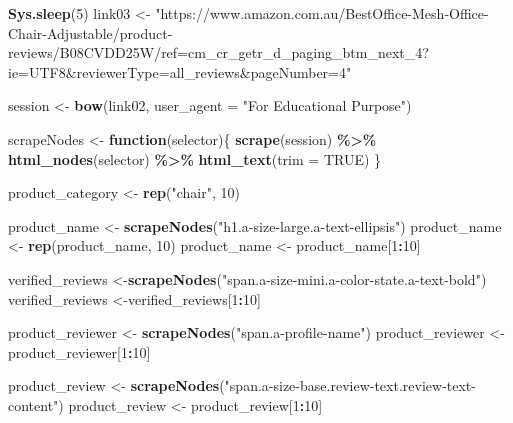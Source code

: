 \documentclass[
]{article}
\newenvironment{Shaded}{\begin{snugshade}}{\end{snugshade}}
\newcommand{\AttributeTok}[1]{\textcolor[rgb]{0.13,0.29,0.53}{#1}}
\newcommand{\ConstantTok}[1]{\textcolor[rgb]{0.56,0.35,0.01}{#1}}
\newcommand{\ControlFlowTok}[1]{\textcolor[rgb]{0.13,0.29,0.53}{\textbf{#1}}}
\newcommand{\DecValTok}[1]{\textcolor[rgb]{0.00,0.00,0.81}{#1}}
\newcommand{\FunctionTok}[1]{\textcolor[rgb]{0.13,0.29,0.53}{\textbf{#1}}}
\newcommand{\NormalTok}[1]{#1}
\newcommand{\OtherTok}[1]{\textcolor[rgb]{0.56,0.35,0.01}{#1}}
\newcommand{\SpecialCharTok}[1]{\textcolor[rgb]{0.81,0.36,0.00}{\textbf{#1}}}
\newcommand{\StringTok}[1]{\textcolor[rgb]{0.31,0.60,0.02}{#1}}
\begin{document}
\begin{Shaded}
\begin{Highlighting}[]
   \FunctionTok{Sys.sleep}\NormalTok{(}\DecValTok{5}\NormalTok{)}
\NormalTok{link03 }\OtherTok{\textless{}{-}} \StringTok{"https://www.amazon.com.au/BestOffice{-}Mesh{-}Office{-}Chair{-}Adjustable/product{-}reviews/B08CVDD25W/ref=cm\_cr\_getr\_d\_paging\_btm\_next\_4?ie=UTF8\&reviewerType=all\_reviews\&pageNumber=4"}


\NormalTok{  session }\OtherTok{\textless{}{-}} \FunctionTok{bow}\NormalTok{(link02,}
               \AttributeTok{user\_agent =} \StringTok{"For Educational Purpose"}\NormalTok{)}

\NormalTok{  scrapeNodes }\OtherTok{\textless{}{-}} \ControlFlowTok{function}\NormalTok{(selector)\{}
    \FunctionTok{scrape}\NormalTok{(session) }\SpecialCharTok{\%\textgreater{}\%}
      \FunctionTok{html\_nodes}\NormalTok{(selector) }\SpecialCharTok{\%\textgreater{}\%}
      \FunctionTok{html\_text}\NormalTok{(}\AttributeTok{trim =} \ConstantTok{TRUE}\NormalTok{)}
\NormalTok{  \}}

\NormalTok{  product\_category }\OtherTok{\textless{}{-}} \FunctionTok{rep}\NormalTok{(}\StringTok{"chair"}\NormalTok{, }\DecValTok{10}\NormalTok{)}

\NormalTok{  product\_name }\OtherTok{\textless{}{-}} \FunctionTok{scrapeNodes}\NormalTok{(}\StringTok{"h1.a{-}size{-}large.a{-}text{-}ellipsis"}\NormalTok{)}
\NormalTok{  product\_name }\OtherTok{\textless{}{-}} \FunctionTok{rep}\NormalTok{(product\_name, }\DecValTok{10}\NormalTok{)}
\NormalTok{  product\_name }\OtherTok{\textless{}{-}}\NormalTok{ product\_name[}\DecValTok{1}\SpecialCharTok{:}\DecValTok{10}\NormalTok{]}
  
\NormalTok{  verified\_reviews }\OtherTok{\textless{}{-}}\FunctionTok{scrapeNodes}\NormalTok{(}\StringTok{"span.a{-}size{-}mini.a{-}color{-}state.a{-}text{-}bold"}\NormalTok{)}
\NormalTok{  verified\_reviews }\OtherTok{\textless{}{-}}\NormalTok{verified\_reviews[}\DecValTok{1}\SpecialCharTok{:}\DecValTok{10}\NormalTok{]}
  
\NormalTok{  product\_reviewer }\OtherTok{\textless{}{-}} \FunctionTok{scrapeNodes}\NormalTok{(}\StringTok{"span.a{-}profile{-}name"}\NormalTok{)}
\NormalTok{  product\_reviewer }\OtherTok{\textless{}{-}}\NormalTok{ product\_reviewer[}\DecValTok{1}\SpecialCharTok{:}\DecValTok{10}\NormalTok{]}
  
\NormalTok{  product\_review }\OtherTok{\textless{}{-}} \FunctionTok{scrapeNodes}\NormalTok{(}\StringTok{"span.a{-}size{-}base.review{-}text.review{-}text{-}content"}\NormalTok{)}
\NormalTok{  product\_review }\OtherTok{\textless{}{-}}\NormalTok{ product\_review[}\DecValTok{1}\SpecialCharTok{:}\DecValTok{10}\NormalTok{]}
  

\end{Highlighting}
\end{Shaded}
\end{document}
